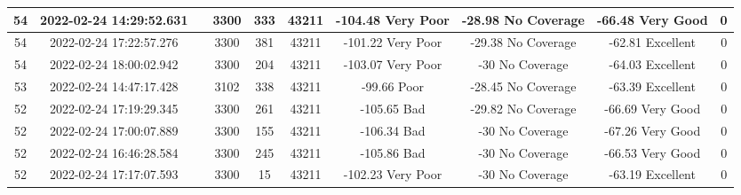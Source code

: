 \begin{longtable*}{|c|c|c|c|c|c|c|c|c|c|}
54&2022-02-24 14:29:52.631&&3300&333&43211& -104.48   Very Poor   & -28.98    No Coverage & -66.48    Very Good   & 0\\\hline
{}54&2022-02-24 17:22:57.276&&3300&381&43211& -101.22   Very Poor   & -29.38    No Coverage & -62.81    Excellent   & 0\\\hline
{}54&2022-02-24 18:00:02.942&&3300&204&43211& -103.07   Very Poor   & -30       No Coverage & -64.03    Excellent   & 0\\\hline
{}53&2022-02-24 14:47:17.428&&3102&338&43211& -99.66    Poor        & -28.45    No Coverage & -63.39    Excellent   & 0\\\hline
{}52&2022-02-24 17:19:29.345&&3300&261&43211& -105.65   Bad         & -29.82    No Coverage & -66.69    Very Good   & 0\\\hline
{}52&2022-02-24 17:00:07.889&&3300&155&43211& -106.34   Bad         & -30       No Coverage & -67.26    Very Good   & 0\\\hline
{}52&2022-02-24 16:46:28.584&&3300&245&43211& -105.86   Bad         & -30       No Coverage & -66.53    Very Good   & 0\\\hline
{}52&2022-02-24 17:17:07.593&&3300&15&43211& -102.23   Very Poor   & -30       No Coverage & -63.19    Excellent   & 0\\\hline

\end{longtable*}
